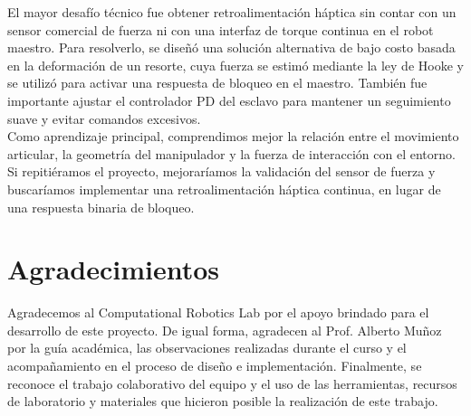 \documentclass[journal,10pt,twoside]{IEEEtran}
\begin{document}
El mayor desafío técnico fue obtener retroalimentación háptica sin contar con un sensor comercial de fuerza ni con una interfaz de torque continua en el robot maestro. Para resolverlo, se diseñó una solución alternativa de bajo costo basada en la deformación de un resorte, cuya fuerza se estimó mediante la ley de Hooke y se utilizó para activar una respuesta de bloqueo en el maestro. También fue importante ajustar el controlador PD del esclavo para mantener un seguimiento suave y evitar comandos excesivos.
\\

Como aprendizaje principal, comprendimos mejor la relación entre el movimiento articular, la geometría del manipulador y la fuerza de interacción con el entorno. Si repitiéramos el proyecto, mejoraríamos la validación del sensor de fuerza y buscaríamos implementar una retroalimentación háptica continua, en lugar de una respuesta binaria de bloqueo.

\section*{Agradecimientos}

Agradecemos al Computational Robotics Lab por el apoyo brindado para el desarrollo de este proyecto. De igual forma, agradecen al Prof. Alberto Muñoz por la guía académica, las observaciones realizadas durante el curso y el acompañamiento en el proceso de diseño e implementación. Finalmente, se reconoce el trabajo colaborativo del equipo y el uso de las herramientas, recursos de laboratorio y materiales que hicieron posible la realización de este trabajo.
\end{document}
